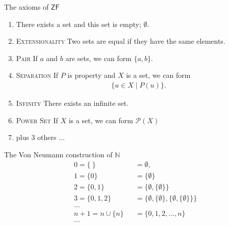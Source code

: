 \documentclass{beamer} %
\begin{document}
\begin{frame}{The axioms of $\mathsf{ZF}$}
    \begin{enumerate}
        \item<1-> There exists a set and this set is empty; $\emptyset$.
        \item<2-> \textsc{Extensionality} Two sets are equal if they have the same elements.
        \item<3-> \textsc{Pair} If $a$ and $b$ are sets, we can form $\{a,b\}$.
        \item<4-> \textsc{Separation} If $P$ is property and $X$ is a set, we can form \begin{align*}
            \{u \in X \mid P(u)\}.    
        \end{align*}
        \item<5-> \textsc{Infinity} There exists an infinite set.
        \item<6-> \textsc{Power Set} If $X$ is a set, we can form $\mathcal{P}(X)$
        \item<7-> plus $3$ others $\dots$ 
    \end{enumerate}
\end{frame}

\begin{frame}{The Von Neumann construction of $\mathbb{N}$}
    \begin{align*}
        &0 = \{ \ \} &&= \emptyset,
        \\&1 = \{ 0 \} &&=\{\emptyset\}
        \\&2 = \{ 0, 1 \} &&=\{ \emptyset, \{\emptyset\} \}
        \\&3 = \{ 0, 1, 2\} &&=\{ \emptyset, \{\emptyset\}, \{ \emptyset, \{\emptyset\} \}\}
        \\&\dots
        \\&n + 1 = n \cup \{ n\} &&=\{0,1,2, \dots , n\}
        \\&\dots
    \end{align*}
\end{frame}
\end{document}
